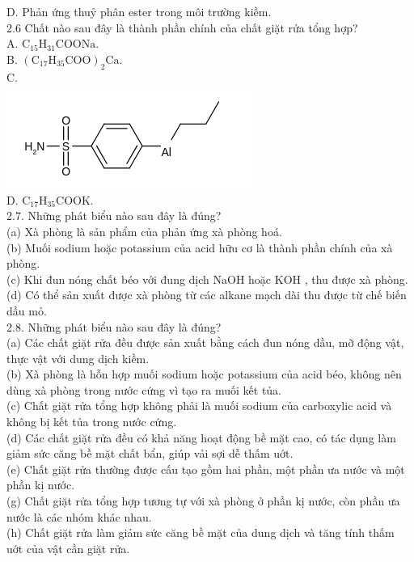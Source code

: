\documentclass[10pt]{article}
\begin{document}
D. Phản ứng thuỷ phân ester trong môi trường kiềm.\\
2.6 Chất nào sau đây là thành phần chính của chất giặt rửa tổng hợp?\\
A. $\mathrm{C}_{15} \mathrm{H}_{31} \mathrm{COONa}$.\\
B. $\left(\mathrm{C}_{17} \mathrm{H}_{35} \mathrm{COO}\right)_{2} \mathrm{Ca}$.\\
C.\\
\includegraphics{smile-49f9c07844d7f9ccf075d51fbd261f56148542f2}\\
D. $\mathrm{C}_{17} \mathrm{H}_{35} \mathrm{COOK}$.\\
2.7. Những phát biểu nào sau đây là đúng?\\
(a) Xà phòng là sản phẩm của phản ứng xà phòng hoá.\\
(b) Muối sodium hoặc potassium của acid hữu cơ là thành phần chính của xà phòng.\\
(c) Khi đun nóng chất béo với đung dịch NaOH hoặc KOH , thu được xà phòng.\\
(d) Có thể sản xuất được xà phòng từ các alkane mạch dài thu được từ chế biến dầu mỏ.\\
2.8. Những phát biểu nào sau đây là đúng?\\
(a) Các chất giặt rửa đều được sản xuất bằng cách đun nóng dầu, mỡ động vật, thực vật với dung dịch kiềm.\\
(b) Xà phòng là hỗn hợp muối sodium hoặc potassium của acid béo, không nên dùng xà phòng trong nước cứng vì tạo ra muối kết tủa.\\
(c) Chất giặt rửa tổng hợp không phải là muối sodium của carboxylic acid và không bị kết tủa trong nước cứng.\\
(d) Các chất giặt rửa đều có khả năng hoạt động bề mặt cao, có tác dụng làm giảm sức căng bề mặt chất bẩn, giúp vải sợi dễ thấm uớt.\\
(e) Chất giặt rửa thường được cấu tạo gồm hai phần, một phần ưa nước và một phần kị nước.\\
(g) Chất giặt rửa tổng hợp tương tự với xà phòng ở phần kị nước, còn phần ưa nước là các nhóm khác nhau.\\
(h) Chất giặt rửa làm giảm sức căng bề mặt của dung dịch và tăng tính thấm uớt của vật cần giặt rửa.\\
\end{document}
